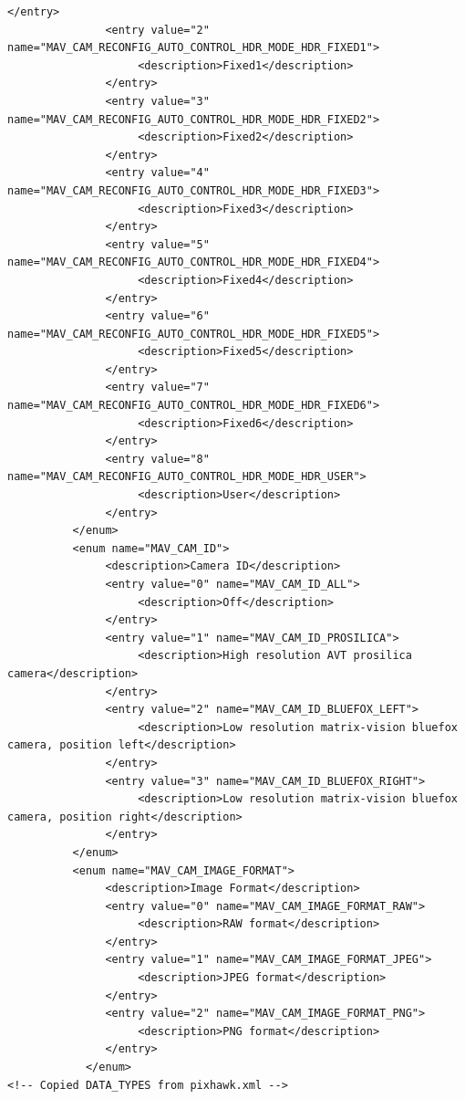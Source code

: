 \begin{lstlisting}[captionpos=b, caption="Definition of \textsc{Skye} specific Mavlink messages", label=app_xml]
               </entry>
               <entry value="2" name="MAV_CAM_RECONFIG_AUTO_CONTROL_HDR_MODE_HDR_FIXED1">
                    <description>Fixed1</description>
               </entry>
               <entry value="3" name="MAV_CAM_RECONFIG_AUTO_CONTROL_HDR_MODE_HDR_FIXED2">
                    <description>Fixed2</description>
               </entry>
               <entry value="4" name="MAV_CAM_RECONFIG_AUTO_CONTROL_HDR_MODE_HDR_FIXED3">
                    <description>Fixed3</description>
               </entry>
               <entry value="5" name="MAV_CAM_RECONFIG_AUTO_CONTROL_HDR_MODE_HDR_FIXED4">
                    <description>Fixed4</description>
               </entry>
               <entry value="6" name="MAV_CAM_RECONFIG_AUTO_CONTROL_HDR_MODE_HDR_FIXED5">
                    <description>Fixed5</description>
               </entry>
               <entry value="7" name="MAV_CAM_RECONFIG_AUTO_CONTROL_HDR_MODE_HDR_FIXED6">
                    <description>Fixed6</description>
               </entry>
               <entry value="8" name="MAV_CAM_RECONFIG_AUTO_CONTROL_HDR_MODE_HDR_USER">
                    <description>User</description>
               </entry>
          </enum>
          <enum name="MAV_CAM_ID">
               <description>Camera ID</description>
               <entry value="0" name="MAV_CAM_ID_ALL">
                    <description>Off</description>
               </entry>
               <entry value="1" name="MAV_CAM_ID_PROSILICA">
                    <description>High resolution AVT prosilica camera</description>
               </entry>
               <entry value="2" name="MAV_CAM_ID_BLUEFOX_LEFT">
                    <description>Low resolution matrix-vision bluefox camera, position left</description>
               </entry>
               <entry value="3" name="MAV_CAM_ID_BLUEFOX_RIGHT">
                    <description>Low resolution matrix-vision bluefox camera, position right</description>
               </entry>
          </enum>
          <enum name="MAV_CAM_IMAGE_FORMAT">
               <description>Image Format</description>
               <entry value="0" name="MAV_CAM_IMAGE_FORMAT_RAW">
                    <description>RAW format</description>
               </entry>
               <entry value="1" name="MAV_CAM_IMAGE_FORMAT_JPEG">
                    <description>JPEG format</description>
               </entry>
               <entry value="2" name="MAV_CAM_IMAGE_FORMAT_PNG">
                    <description>PNG format</description>
               </entry>
	        </enum>
<!-- Copied DATA_TYPES from pixhawk.xml -->

\end{lstlisting}
